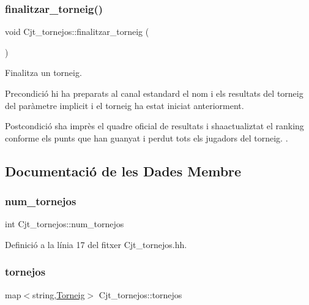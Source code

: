 \subsubsection{\texorpdfstring{finalitzar\+\_\+torneig()}{finalitzar\_torneig()}}
{\footnotesize\ttfamily void Cjt\+\_\+tornejos\+::finalitzar\+\_\+torneig (\begin{DoxyParamCaption}{ }\end{DoxyParamCaption})}



Finalitza un torneig. 

\begin{DoxyPrecond}{Precondició}
hi ha preparats al canal estandard el nom i els resultats del torneig del paràmetre implicit i el torneig ha estat iniciat anteriorment. 
\end{DoxyPrecond}
\begin{DoxyPostcond}{Postcondició}
s\textquotesingle{}ha imprès el quadre oficial de resultats i s\textquotesingle{}haactualiztat el ranking conforme els punts que han guanyat i perdut tots els jugadors del torneig. . 
\end{DoxyPostcond}


\subsection{Documentació de les Dades Membre}
\mbox{\label{class_cjt__tornejos_afe968dc02bf4f83842c53c5a76182f2f}} 
\subsubsection{\texorpdfstring{num\+\_\+tornejos}{num\_tornejos}}
{\footnotesize\ttfamily int Cjt\+\_\+tornejos\+::num\+\_\+tornejos\hspace{0.3cm}{\ttfamily [private]}}



Definició a la línia 17 del fitxer Cjt\+\_\+tornejos.\+hh.

\mbox{\label{class_cjt__tornejos_a4b3d9bdd2ed133d76284fb510ebe9800}} 
\subsubsection{\texorpdfstring{tornejos}{tornejos}}
{\footnotesize\ttfamily map$<$string,\mbox{\hyperlink{class_torneig}{Torneig}}$>$ Cjt\+\_\+tornejos\+::tornejos\hspace{0.3cm}{\ttfamily [private]}}



